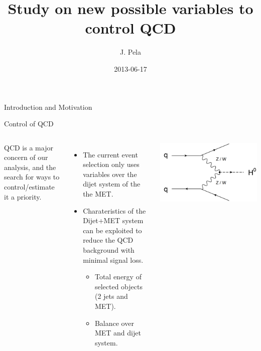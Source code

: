 \documentclass[8pt]{beamer}
\author[João Pela]{J. Pela}
\title[QCD Control]{Study on new possible variables to control QCD}
\institute{Imperial College London}
\date{2013-06-17}
\begin{document}
\setlength{\unitlength}{1mm}

\begin{frame}
  \titlepage
\end{frame}

\begin{frame}{Introduction and Motivation}

\begin{block}{Control of QCD}
  
\begin{columns}
  
  \column[t]{5.5cm}
  QCD is a major concern of our analysis, and the search for ways to control/estimate it a priority.
  \begin{itemize}
    \item The current event selection only uses variables over the dijet system of the the MET.
    \item Charateristics of the Dijet+MET system can be exploited to reduce the QCD background 
    with minimal signal loss.
    \begin{itemize}
      \item Total energy of selected objects (2 jets and MET).
      \item Balance over MET and dijet system.
    \end{itemize}
  \end{itemize}
  
  \column[t]{5.5cm}
    \begin{center}
      \includegraphics[width=1.00\textwidth]{img/vector_boson_fusion.PNG} 
    \end{center}
  
\end{columns}
  
\end{block}

\end{frame}
\end{document}
